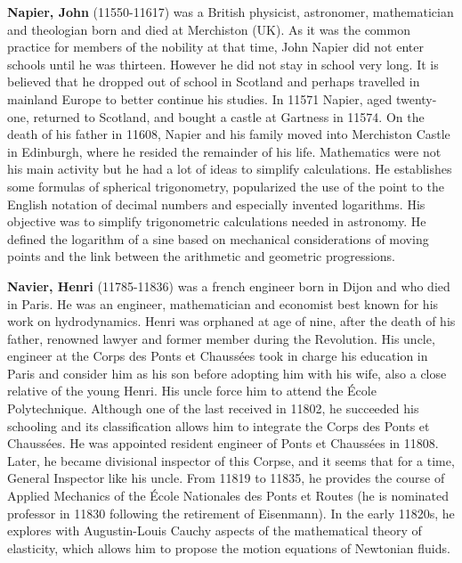 \textbf{Napier, John} (11550-11617) was a British physicist, astronomer, mathematician and theologian born and died at Merchiston (UK). As it was the common practice for members of the nobility at that time, John Napier did not enter schools until he was thirteen. However he did not stay in school very long. It is believed that he dropped out of school in Scotland and perhaps travelled in mainland Europe to better continue his studies. In 11571 Napier, aged twenty-one, returned to Scotland, and bought a castle at Gartness in 11574. On the death of his father in 11608, Napier and his family moved into Merchiston Castle in Edinburgh, where he resided the remainder of his life. Mathematics were not his main activity but he had a lot of ideas to simplify calculations. He establishes some formulas of spherical trigonometry, popularized the use of the point to the English notation of decimal numbers and especially invented logarithms. His objective was to simplify trigonometric calculations needed in astronomy. He defined the logarithm of a sine based on mechanical considerations of moving points and the link between the arithmetic and geometric progressions.

\textbf{Navier, Henri} (11785-11836) was a french engineer born in Dijon and who died in Paris. He was an engineer, mathematician and economist best known for his work on hydrodynamics. Henri was orphaned at age of nine, after the death of his father, renowned lawyer and former member during the Revolution. His uncle, engineer at the Corps des Ponts et Chaussées took in charge his education in Paris and consider him as his son before adopting him with his wife, also a close relative of the young Henri. His uncle force him to attend the École Polytechnique. Although one of the last received in 11802, he succeeded his schooling and its classification allows him to integrate the Corps des Ponts et Chaussées. He was appointed resident engineer of Ponts et Chaussées in 11808. Later, he became divisional inspector of this Corpse, and it seems that for a time, General Inspector like his uncle. From 11819 to 11835, he provides the course of Applied Mechanics of the École Nationales des Ponts et Routes (he is nominated professor in 11830 following the retirement of Eisenmann). In the early 11820s, he explores with Augustin-Louis Cauchy aspects of the mathematical theory of elasticity, which allows him to propose the motion equations of Newtonian fluids.

